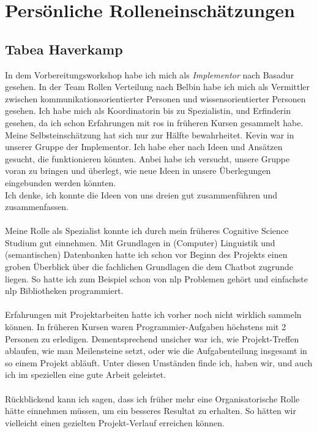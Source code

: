 \documentclass[12pt]{article}
\begin{document}
\clearpage

\section{Persönliche Rolleneinschätzungen}
\subsection{Tabea Haverkamp}
In dem Vorbereitungsworkshop habe ich mich als \textit{Implementor} nach Basadur gesehen. In der Team Rollen Verteilung nach Belbin habe ich mich als Vermittler zwischen kommunikationsorientierter Personen und wissensorientierter Personen gesehen. Ich habe mich als Koordinatorin bis zu Spezialistin, und Erfinderin gesehen, da ich schon Erfahrungen mit \ac{ros} in früheren Kursen gesammelt habe.
Meine Selbsteinschätzung hat sich nur zur Hälfte bewahrheitet. Kevin war in unserer Gruppe der Implementor. Ich habe eher nach Ideen und Ansätzen gesucht, die funktionieren könnten. Anbei habe ich versucht, unsere Gruppe voran zu bringen und überlegt, wie neue Ideen in unsere Überlegungen eingebunden werden könnten. \\
Ich denke, ich konnte die Ideen von uns dreien gut zusammenführen und zusammenfassen. \\
\\
Meine Rolle als Spezialist konnte ich durch mein früheres Cognitive Science Studium gut einnehmen. Mit Grundlagen in (Computer) Linguistik und (semantischen) Datenbanken hatte ich schon vor Beginn des Projekts einen groben Überblick über die fachlichen Grundlagen die dem Chatbot zugrunde liegen. So hatte ich zum Beispiel schon von \ac{nlp} Problemen gehört und einfachste \ac{nlp} Bibliotheken programmiert. \\ \\
Erfahrungen mit Projektarbeiten hatte ich vorher noch nicht wirklich sammeln können. In früheren Kursen waren Programmier-Aufgaben höchstens mit 2 Personen zu erledigen. Dementsprechend unsicher war ich, wie Projekt-Treffen ablaufen, wie man Meilensteine setzt, oder wie die Aufgabenteilung insgesamt in so einem Projekt abläuft. Unter diesen Umständen finde ich, haben wir, und auch ich im speziellen eine gute Arbeit geleistet. \\ \\
Rückblickend kann ich sagen, dass ich früher mehr eine Organisatorische Rolle hätte einnehmen müssen, um ein besseres Resultat zu erhalten. So hätten wir vielleicht einen gezielten Projekt-Verlauf erreichen können.
\end{document}
